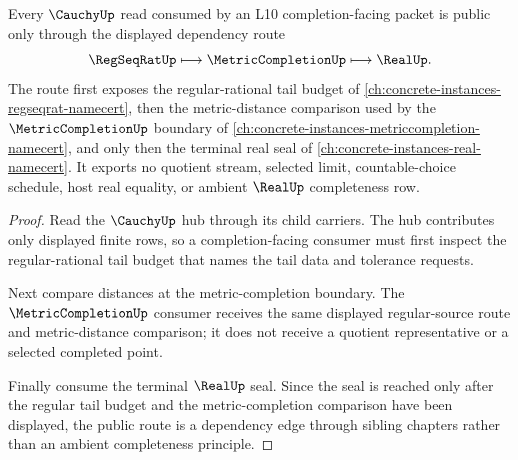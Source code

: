 \begin{theorem}
\label{thm:cauchy-regseqrat-metric-completion-dependency-route}
Every $\CauchyUp$ read consumed by an L10 completion-facing packet is public only through the displayed dependency route
$$
\RegSeqRatUp \longmapsto \MetricCompletionUp \longmapsto \RealUp .
$$
The route first exposes the regular-rational tail budget of \autoref{ch:concrete-instances-regseqrat-namecert}, then the metric-distance comparison used by the $\MetricCompletionUp$ boundary of \autoref{ch:concrete-instances-metriccompletion-namecert}, and only then the terminal real seal of \autoref{ch:concrete-instances-real-namecert}. It exports no quotient stream, selected limit, countable-choice schedule, host real equality, or ambient $\RealUp$ completeness row.
\end{theorem}
\begin{proof}
Read the $\CauchyUp$ hub through its child carriers. The hub contributes only displayed finite rows, so a completion-facing consumer must first inspect the regular-rational tail budget that names the tail data and tolerance requests.

Next compare distances at the metric-completion boundary. The $\MetricCompletionUp$ consumer receives the same displayed regular-source route and metric-distance comparison; it does not receive a quotient representative or a selected completed point.

Finally consume the terminal $\RealUp$ seal. Since the seal is reached only after the regular tail budget and the metric-completion comparison have been displayed, the public route is a dependency edge through sibling chapters rather than an ambient completeness principle.
\end{proof}
